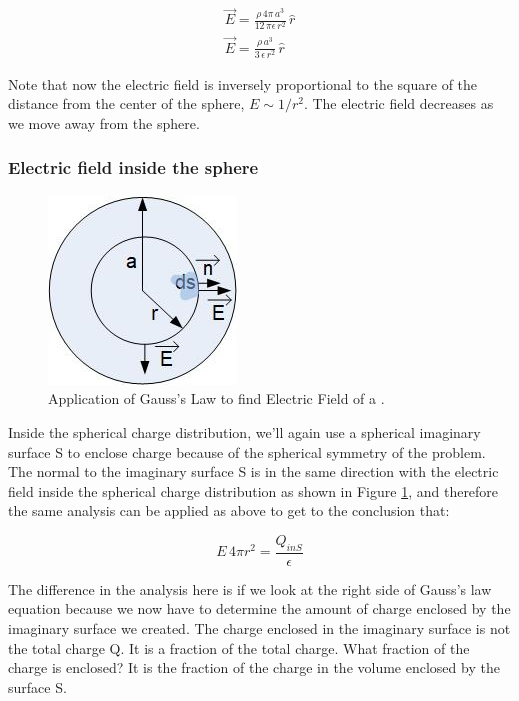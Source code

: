 \documentclass{ximera}
\begin{document}
\begin{eqnarray}
 \vec{E}  = \frac{\rho \, 4 \pi \, a^3}{12 \, \pi  \epsilon \, r^2} \, \hat{r} \\
 \vec{E}  = \frac{\rho \,   a^3}{3  \, \epsilon \, r^2} \, \hat{r}
\end{eqnarray}


Note that now the electric field is inversely proportional to the square of the distance from the center of the sphere, $E \sim 1/r^2$. The electric field decreases as we move away from the sphere.

\subsubsection{Electric field inside the sphere}




\begin{figure}[htbp]
\begin{center}
\includegraphics[scale=1]{../jpg/gaussSphereIn.jpg}
\end{center}
\caption{Application of Gauss's Law to find Electric Field of a .}
\label{fig:gaussSphereIn}
\end{figure}

Inside the spherical charge distribution, we'll again use a spherical imaginary surface  S to enclose charge because of the spherical symmetry of the problem. The normal to the imaginary surface S is in the same direction with the electric field inside the spherical charge distribution as shown in Figure \ref{fig:gaussSphereIn}, and therefore the same analysis can be applied as above to get to the conclusion that:



\begin{equation}
 E \, 4 \pi r^2 = \frac{Q_{inS}}{\epsilon}
\end{equation}




The difference in the analysis here is if we look at the right side of Gauss's law equation because we now have to determine the amount of charge enclosed by the imaginary surface we created. The charge enclosed in the imaginary surface is not the total charge Q. It is a fraction of the total charge. What fraction of the charge is enclosed? It is the fraction of the charge in the volume enclosed by the surface S. 
\end{document}
